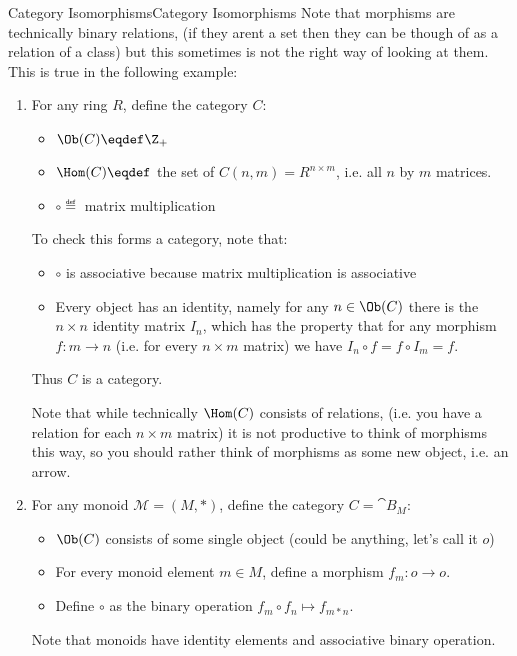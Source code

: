 \documentclass[12pt]{article}
\begin{document}
\begin{example}{Category Isomorphisms}{Category Isomorphisms}
	Note that morphisms are technically binary relations, (if they arent a set then they can be though of as a relation of a class) 
	but this sometimes is not the right way of looking at them.
	This is true in the following example: 
	\begin{enumerate}
		\item
		 For any ring $R$, define the category $C$:
		\begin{itemize}
			\item
			 $\Ob(C) \eqdef \Z_+$
			\item
			 $\Hom(C)\eqdef$ the set of $C(n,m)= R^{n \times m}$, i.e. all $n$ by $m$ matrices.
			\item
			 $\circ \eqdef$ matrix multiplication
		\end{itemize}
		To check this forms a category, note that:
		\begin{itemize}
			\item
			 $\circ$ is associative because matrix multiplication is associative
			\item
			
			Every object has an identity, namely for any $n \in \Ob(C)$ there is the $n\times n$ identity matrix $I_n$, which has the property that
			for any morphism $f:m \to n$ (i.e. for every $n \times m$ matrix) we have $I_n \circ f = f \circ I_m = f$.
		\end{itemize}
		
		
		Thus $C$ is a category. 
		
		Note that while technically $\Hom(C)$ consists of relations, (i.e. you have a relation for each $n\times m$ matrix)
		it is not productive to think of morphisms this way, so you should rather think of morphisms as some new object, i.e. an arrow.
		\item
		
		For any monoid $\mathcal M = (M,*)$, define the category $C=\cat{B}_M$:
		\begin{itemize}
			\item
			 $\Ob(C)$ consists of some single object (could be anything, let's call it $o$)
			\item
			 For every monoid element $m \in M$, define a morphism $f_{m}: o \to o$.
			\item
			 Define $\circ$ as the binary operation $f_m \circ f_n \mapsto f_{m * n}$.
		\end{itemize}
		
		Note that monoids have identity elements and associative binary operation.
	\end{enumerate}
\end{example}
\end{document}
